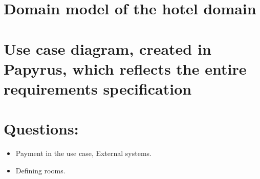 \documentclass[utf8]{article}
\begin{document}
	\section{Domain model of the hotel domain}
	\section{Use case diagram, created in Papyrus, which reflects the entire requirements specification}
	\section{Questions:}
	\begin{itemize}
		\item Payment in the use case, External systems.
		\item Defining rooms.
	\end{itemize}
\end{document}
